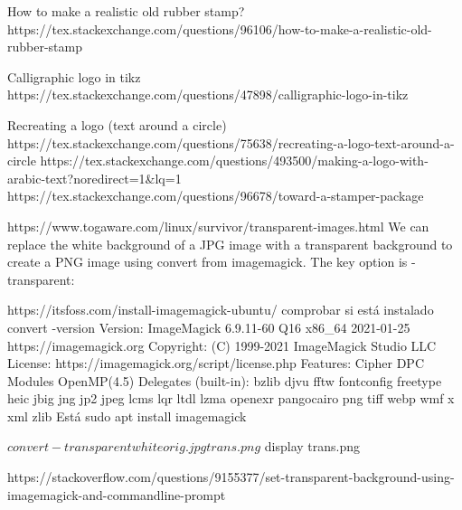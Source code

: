 How to make a realistic old rubber stamp?
https://tex.stackexchange.com/questions/96106/how-to-make-a-realistic-old-rubber-stamp


Calligraphic logo in tikz
https://tex.stackexchange.com/questions/47898/calligraphic-logo-in-tikz

Recreating a logo (text around a circle)
https://tex.stackexchange.com/questions/75638/recreating-a-logo-text-around-a-circle
https://tex.stackexchange.com/questions/493500/making-a-logo-with-arabic-text?noredirect=1&lq=1
https://tex.stackexchange.com/questions/96678/toward-a-stamper-package


https://www.togaware.com/linux/survivor/transparent-images.html
We can replace the white background of a JPG image with a transparent background to create a PNG image using convert from imagemagick. The key option is -transparent:


https://itsfoss.com/install-imagemagick-ubuntu/
comprobar si está instalado
convert -version
Version: ImageMagick 6.9.11-60 Q16 x86_64 2021-01-25 https://imagemagick.org
Copyright: (C) 1999-2021 ImageMagick Studio LLC
License: https://imagemagick.org/script/license.php
Features: Cipher DPC Modules OpenMP(4.5) 
Delegates (built-in): bzlib djvu fftw fontconfig freetype heic jbig jng jp2 jpeg lcms lqr ltdl lzma openexr pangocairo png tiff webp wmf x xml zlib
Está
sudo apt install imagemagick


$ convert -transparent white orig.jpg trans.png
$ display trans.png


https://stackoverflow.com/questions/9155377/set-transparent-background-using-imagemagick-and-commandline-prompt
















